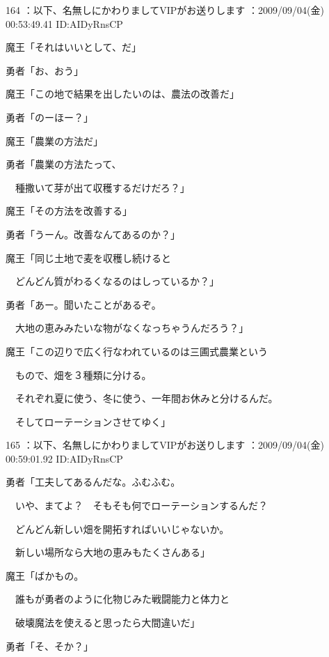 \documentclass[a4j,twocolumn]{tarticle}
\begin{document}
	
    
    

164 ：以下、名無しにかわりましてVIPがお送りします ：2009/09/04(金) 00:53:49.41 ID:AIDyRnsCP 


魔王「それはいいとして、だ」\par{} 
勇者「お、おう」 



魔王「この地で結果を出したいのは、農法の改善だ」\par{} 
勇者「のーほー？」 



魔王「農業の方法だ」\par{} 
勇者「農業の方法たって、\par{} 
　種撒いて芽が出て収穫するだけだろ？」 



魔王「その方法を改善する」\par{} 
勇者「うーん。改善なんてあるのか？」 



魔王「同じ土地で麦を収穫し続けると \par{}
　どんどん質がわるくなるのはしっているか？」\par{} 
勇者「あー。聞いたことがあるぞ。\par{} 
　大地の恵みみたいな物がなくなっちゃうんだろう？」 



魔王「この辺りで広く行なわれているのは三圃式農業という\par{} 
　もので、畑を３種類に分ける。\par{} 
　それぞれ夏に使う、冬に使う、一年間お休みと分けるんだ。\par{} 
　そしてローテーションさせてゆく」 

	
    
    

165 ：以下、名無しにかわりましてVIPがお送りします ：2009/09/04(金) 00:59:01.92 ID:AIDyRnsCP 


勇者「工夫してあるんだな。ふむふむ。\par{} 
　いや、まてよ？　そもそも何でローテーションするんだ？\par{} 
　どんどん新しい畑を開拓すればいいじゃないか。\par{} 
　新しい場所なら大地の恵みもたくさんある」 



魔王「ばかもの。\par{} 
　誰もが勇者のように化物じみた戦闘能力と体力と\par{} 
　破壊魔法を使えると思ったら大間違いだ」\par{} 
勇者「そ、そか？」 
\end{document}
